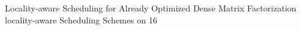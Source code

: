 \begin{frame}[label=ladmf]{Locality-aware Scheduling for Already Optimized Dense Matrix Factorization}
locality-aware Scheduling Schemes on 16
\end{frame}
